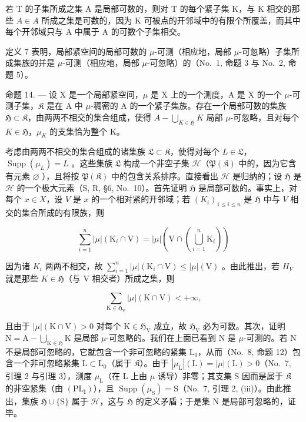 若 T 的子集所成之集 A 是局部可数的，则对 T 的每个紧子集 K，与 K 相交的那些 \(A \in A\) 所成之集是可数的，因为 K 可被点的开邻域中的有限个所覆盖，而其中每个开邻域只与 A 中属于 A 的可数个子集相交。

定义 7 表明，局部紧空间的局部可数的 \(\mu\)-可测（相应地，局部 \(\mu\)-可忽略）子集所成集族的并是 \(\mu\)-可测（相应地，局部 \(\mu\)-可忽略）的（No.~1, 命题 3 与 No.~2, 命题 5）。

命题 14. --- 设 X 是一个局部紧空间，\(\mu\) 是 X 上的一个测度，A 是 X 的一个 \(\mu\)-可测子集，\(\mathfrak{K}\) 是在 A 中 \(\mu\)-稠密的 A 的一个紧子集族。存在一个局部可数的集族 \(\mathfrak{H} \subset \mathfrak{K}\)，由两两不相交的集合组成，使得 \(A - \bigcup_{K \in \mathfrak{H}} K\) 局部 \(\mu\)-可忽略，且对每个 \(K \in \mathfrak{H}\)，\(\mu_K\) 的支集恰为整个 K。

考虑由两两不相交的集合组成的诸集族 \(\mathfrak{L} \subset \mathfrak{K}\)，使得对每个 \(L \in \mathfrak{L}\)，\(\operatorname{Supp}(\mu_L) = L\) 。这些集族 \(\mathfrak{L}\) 构成一个非空子集 \(\mathscr{H}\)（\(\mathfrak{P}(\mathfrak{K})\) 中的，因为它含有元素 \(\varnothing\) ），且将按 \(\mathfrak{P}(\mathfrak{K})\) 中的包含关系排序。直接看出 \(\mathscr{H}\) 是归纳的；设 \(\mathfrak{H}\) 是 \(\mathscr{H}\) 的一个极大元素（S, R, §6, No.~10）。首先证明 \(\mathfrak{H}\) 是局部可数的。事实上，对每个 \(x \in X\)，设 \(V\) 是 \(x\) 的一个相对紧的开邻域；若 \((K_i)_{1 \leqslant i \leqslant n}\) 是 \(\mathfrak{H}\) 中与 \(V\) 相交的集合所成的有限族，则

\[
\sum_ {i = 1} ^ {n} | \mu | \left(\mathrm{K} _ {i} \cap \mathrm{V}\right) = | \mu | \left(\mathrm{V} \cap \left(\bigcup_ {i = 1} ^ {n} \mathrm{K} _ {i}\right)\right)
\]

因为诸 \(K_{i}\) 两两不相交，故 \(\sum_{i=1}^{n}| \mu |(\mathrm{K}_{i} \cap \mathrm{V}) \leqslant |\mu |(\mathrm{V})\) 。由此推出，若 \(H_{V}\) 就是那些 \(K \in \mathfrak{H}\)（与 V 相交者）所成之集，则

\[
\sum_ {\mathrm{K} \in \mathfrak {H} _ {\mathrm{V}}} | \mu | (\mathrm{K} \cap \mathrm{V}) <   + \infty ,
\]

且由于 \(|\mu|(\mathrm{K} \cap \mathrm{V}) > 0\) 对每个 \(\mathrm{K} \in \mathfrak{H}_{\mathrm{V}}\) 成立，故 \(\mathfrak{H}_{\mathrm{V}}\) 必为可数。其次，证明 \(\mathrm{N} = \mathrm{A} - \bigcup_{\mathrm{K} \in \mathfrak{H}} \mathrm{K}\) 是局部 \(\mu\)-可忽略的。我们在上面已看到 \(\mathrm{N}\) 是 \(\mu\)-可测的。若 \(\mathrm{N}\) 不是局部可忽略的，它就包含一个非可忽略的紧集 \(\mathrm{L}_0\)，从而（No.~8, 命题 12）包含一个非可忽略紧集 \(\mathrm{L} \subset \mathrm{L}_0\)（属于 \(\mathfrak{K}\)）。由于 \(|\mu_{\mathrm{L}}|(\mathrm{L}) = |\mu|(\mathrm{L}) > 0\)（No.~7, 引理 2 与引理 3），测度 \(\mu_{\mathrm{L}}\)（在 \(\mathrm{L}\) 上由 \(\mu\) 诱导）非零；其支集 \(\mathrm{S}\) 因而是属于 \(\mathfrak{K}\) 的非空紧集（由 \((\mathrm{PL}_{\mathrm{I}})\)），且 \(\operatorname{Supp}(\mu_{\mathrm{S}}) = \mathrm{S}\)（No.~7, 引理 2, (iii)）。由此推出，集族 \(\mathfrak{H} \cup \{\mathrm{S}\}\) 属于 \(\mathscr{H}\)，这与 \(\mathfrak{H}\) 的定义矛盾；于是集 \(\mathrm{N}\) 是局部可忽略的，证毕。

